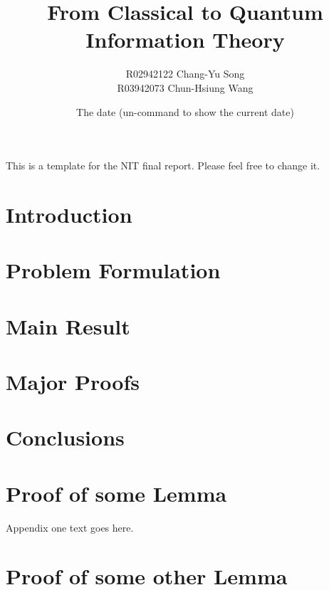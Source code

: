 \documentclass[12pt]{article}
\title{From Classical to Quantum Information Theory}
\author{R02942122 Chang-Yu Song \\
        R03942073 Chun-Hsiung Wang}
\date{The date (un-command to show the current date)}
\begin{document}
\maketitle

\thispagestyle{fancyplain}

This is a template for the NIT final report. Please feel free to change it.

\begin{abstract}

\end{abstract}

\section{Introduction}\label{sec_Intro}
%

\section{Problem Formulation}\label{sec_Formulation}
%

\section{Main Result}\label{sec_Result}
%

\section{Major Proofs}\label{sec_Proof}
%

\section{Conclusions}\label{sec_Conclusion}
%





\appendix
\section{Proof of some Lemma}
Appendix one text goes here.

\section{Proof of some other Lemma}
\end{document}
